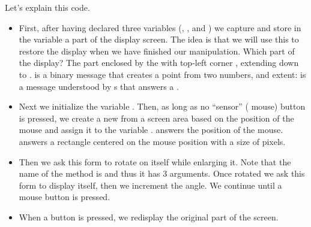 \documentclass[a4paper,10pt,twoside]{book}
\begin{document}
Let's explain this code.
\begin{itemize}
\item First, after having declared three variables (, , and ) we capture and store in the variable  a part of the display screen.
The idea is that we will use this to restore the display when we have finished our manipulation.
Which part of the display?
The part enclosed by the  with top-left corner , extending down to .
 is a binary message that creates a point from two numbers, and extent: is a message understood by s that answers a .
\item Next we initialize the variable . Then, as long as no ``sensor'' (\ie{} mouse) button is pressed, we create a new  from a screen area based on the position of the
mouse and assign it to the variable .  answers the position of the mouse.  answers a rectangle centered on the mouse position with a size of  pixels.
\item Then we ask this form to rotate on itself while enlarging it.
Note that the name of the method is 
and thus it has 3 arguments. Once rotated we ask this form to display itself,
then we increment the angle. We continue until a mouse button is pressed.
\item When a button is pressed, we redisplay the original part of the screen.
\end{itemize}

\ifx\wholebook\relax\else
\end{document}
